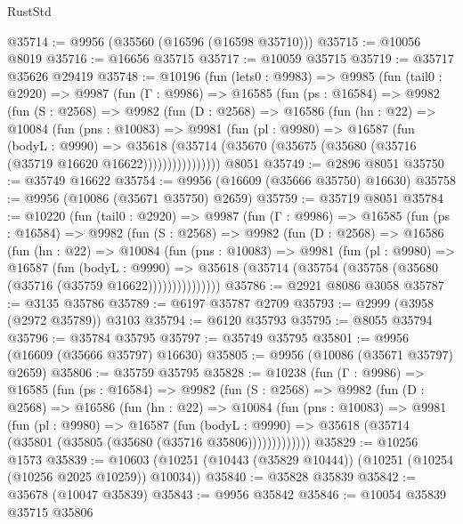 \begin{lexlean}{RustStd}
\begin{coremodule}
@35714 := @9956 (@35560 (@16596 (@16598 @35710)))
@35715 := @10056 @8019
@35716 := @16656 @35715
@35717 := @10059 @35715
@35719 := @35717 @35626 @29419
@35748 := @10196
    (fun (lets0 : @9983) =>
    @9985
      (fun (tail0 : @2920) =>
      @9987
        (fun (Γ : @9986) =>
        @16585
          (fun (ps : @16584) =>
          @9982
            (fun (S : @2568) =>
            @9982
              (fun (D : @2568) =>
              @16586
                (fun (hn : @22) =>
                @10084
                  (fun (pns : @10083) =>
                  @9981
                    (fun (pl : @9980) =>
                    @16587
                      (fun (bodyL : @9990) =>
                      @35618
                        (@35714
                          (@35670 (@35675 (@35680 (@35716 (@35719 @16620 @16622))))))))))))))))
    @8051
@35749 := @2896 @8051
@35750 := @35749 @16622
@35754 := @9956 (@16609 (@35666 @35750) @16630)
@35758 := @9956 (@10086 (@35671 @35750) @2659)
@35759 := @35719 @8051
@35784 := @10220
    (fun (tail0 : @2920) =>
    @9987
      (fun (Γ : @9986) =>
      @16585
        (fun (ps : @16584) =>
        @9982
          (fun (S : @2568) =>
          @9982
            (fun (D : @2568) =>
            @16586
              (fun (hn : @22) =>
              @10084
                (fun (pns : @10083) =>
                @9981
                  (fun (pl : @9980) =>
                  @16587
                    (fun (bodyL : @9990) =>
                    @35618 (@35714 (@35754 (@35758 (@35680 (@35716 (@35759 @16622)))))))))))))))
@35786 := @2921 @8086 @3058
@35787 := @3135 @35786
@35789 := @6197 @35787 @2709
@35793 := @2999 (@3958 (@2972 @35789)) @3103
@35794 := @6120 @35793
@35795 := @8055 @35794
@35796 := @35784 @35795
@35797 := @35749 @35795
@35801 := @9956 (@16609 (@35666 @35797) @16630)
@35805 := @9956 (@10086 (@35671 @35797) @2659)
@35806 := @35759 @35795
@35828 := @10238
    (fun (Γ : @9986) =>
    @16585
      (fun (ps : @16584) =>
      @9982
        (fun (S : @2568) =>
        @9982
          (fun (D : @2568) =>
          @16586
            (fun (hn : @22) =>
            @10084
              (fun (pns : @10083) =>
              @9981
                (fun (pl : @9980) =>
                @16587
                  (fun (bodyL : @9990) =>
                  @35618 (@35714 (@35801 (@35805 (@35680 (@35716 @35806)))))))))))))
@35829 := @10256 @1573
@35839 := @10603 (@10251 (@10443 (@35829 @10444)) (@10251 (@10254 (@10256 @2025 @10259)) @10034))
@35840 := @35828 @35839
@35842 := @35678 (@10047 @35839)
@35843 := @9956 @35842
@35846 := @10054 @35839 @35715 @35806

\end{coremodule}
\end{lexlean}
